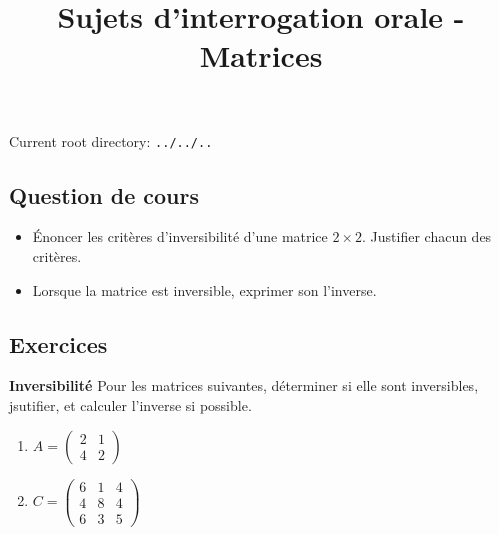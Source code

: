 \documentclass[10pt,a4paper]{article}
\title{Sujets d'interrogation orale - Matrices}
\author{}
\date{}
\providecommand{\rootpath}{../../..}
\begin{document}
\maketitle
Current root directory: \texttt{\rootpath}

\subsection*{Question de cours}
\begin{itemize}
    \item Énoncer les critères d'inversibilité d'une matrice $2 \times 2$. Justifier chacun des critères.
    \item Lorsque la matrice est inversible, exprimer son l'inverse.
\end{itemize}

\bigskip

\subsection*{Exercices}

\textbf{Inversibilité}
Pour les matrices suivantes, déterminer si elle sont inversibles, jsutifier, et calculer l'inverse
si possible.
\begin{enumerate}
    \item $A = \begin{pmatrix} 2 & 1 \\ 4 & 2 \end{pmatrix}$
    \item $C = \begin{pmatrix}
        6 & 1 & 4 \\
        4 & 8 & 4 \\
        6 & 3 & 5
        \end{pmatrix}$
\end{enumerate}

\bigskip
\end{document}
